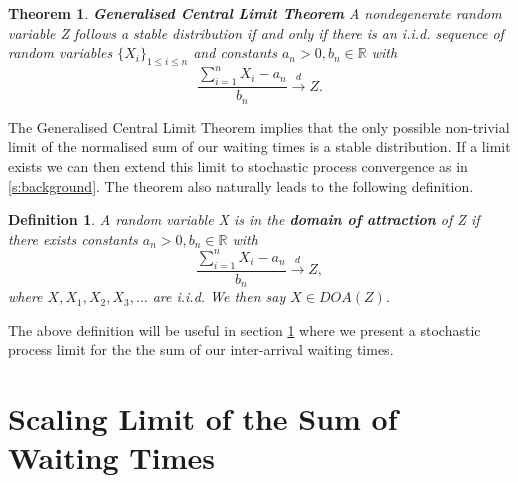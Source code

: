 \documentclass[honours,12pt]{unswthesis}
\newcommand{\R}{\mathbb{R}}
\newcommand{\1}{\mathbf 1}
\newtheorem{theorem}[equation]{Theorem}
\newtheorem{definition}[equation]{Definition}
\numberwithin{equation}{section}
\theoremstyle{definition}
\theoremstyle{remark}
\begin{document}
\begin{theorem}\cite{Nolan2015}\label{th:gclt}
\textbf{Generalised Central Limit Theorem} A nondegenerate random variable Z follows a stable distribution if and only if there is an i.i.d. sequence of random variables $\{X_i\}_{1\leq i \leq n}$  and constants $a_n>0, b_n \in \R$ with 
\[
	\frac{\sum^n_{i=1}X_i-a_n}{b_n} \overset{d}{\longrightarrow}Z.
\]
\end{theorem}

\noindent The Generalised Central Limit Theorem implies that the only possible non-trivial limit of the normalised sum of our waiting times is a stable distribution. If a limit exists we can then extend this limit to stochastic process convergence as in \ref{s:background}. The theorem also naturally leads to the following definition.\\

\begin{definition}\cite{Nolan2015}\label{def:DOA}
	A random variable X is in the \textbf{domain of attraction} of Z if there exists constants $a_n>0,b_n\in\R$ with
	\[
		\frac{\sum^n_{i=1}X_i-a_n}{b_n} \overset{d}{\longrightarrow}Z,
	\]
	where $X, X_1, X_2, X_3, \ldots$ are i.i.d. We then say $X\in DOA(Z)$.\\
\end{definition}

\noindent The above definition will be useful in section \ref{s:waitingTimes} where we present a stochastic process limit for the the sum of our inter-arrival waiting times.\\

\section{Scaling Limit of the Sum of Waiting Times}\label{s:waitingTimes}
\end{document}
